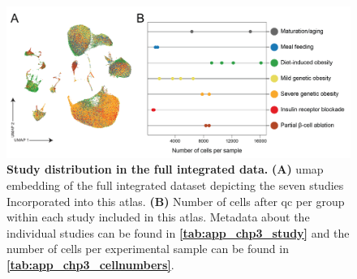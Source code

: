 \begin{figure}[H]
\centering
\vspace{-30pt}
\includegraphics[width=\linewidth]{Appendix2/Fig/F3-2-v2-02.png}
\caption[Study distribution in the full integrated data]{\textbf{Study distribution in the full integrated data.} \textbf{(A)} \gls{umap} embedding of the full integrated dataset depicting the seven studies Incorporated into this atlas. \textbf{(B)} Number of cells after \gls{qc} per group within each study included in this atlas. Metadata about the individual studies can be found in \textbf{\autoref{tab:app_chp3_study}} and the number of cells per experimental sample can be found in \textbf{\autoref{tab:app_chp3_cellnumbers}}.}
\label{fig:app_chp3_study}
\end{figure}
\vspace{-22pt}



